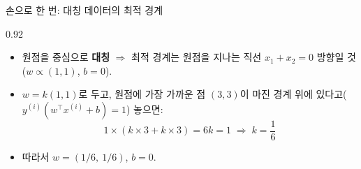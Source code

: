 \begin{frame}{손으로 한 번: 대칭 데이터의 최적 경계}
\begin{center}\begin{varwidth}{0.92\textwidth}
  
  \begin{itemize}
    \item 원점을 중심으로 \textbf{대칭} $\Rightarrow$ 최적 경계는 원점을
      지나는 직선 $x_1+x_2=0$ 방향일 것 ($w \propto (1,1)$, $b=0$).
    \item $w=k(1,1)$로 두고, 원점에 가장 가까운 점 $(3,3)$이
      마진 경계 위에 있다고($y^{(i)}(w^\top x^{(i)}+b)=1$) 놓으면:
      \[
      1 \times (k\times3 + k\times3) = 6k = 1
      \;\Longrightarrow\; k = \frac{1}{6}
      \]
    \item 따라서 $w = (1/6,\ 1/6)$, $b = 0$.
  \end{itemize}
\end{varwidth}\end{center}
\end{frame}
